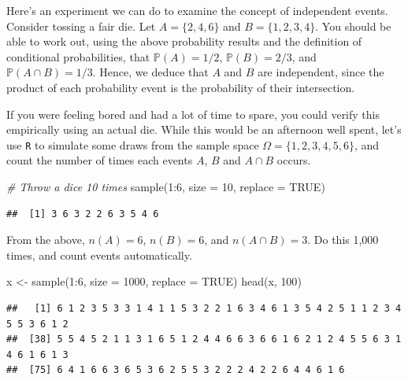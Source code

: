 \documentclass[
]{book}
\newenvironment{Shaded}{\begin{snugshade}}{\end{snugshade}}
\newcommand{\AttributeTok}[1]{\textcolor[rgb]{0.77,0.63,0.00}{#1}}
\newcommand{\CommentTok}[1]{\textcolor[rgb]{0.56,0.35,0.01}{\textit{#1}}}
\newcommand{\ConstantTok}[1]{\textcolor[rgb]{0.00,0.00,0.00}{#1}}
\newcommand{\DecValTok}[1]{\textcolor[rgb]{0.00,0.00,0.81}{#1}}
\newcommand{\FunctionTok}[1]{\textcolor[rgb]{0.00,0.00,0.00}{#1}}
\newcommand{\NormalTok}[1]{#1}
\newcommand{\OtherTok}[1]{\textcolor[rgb]{0.56,0.35,0.01}{#1}}
\newcommand{\SpecialCharTok}[1]{\textcolor[rgb]{0.00,0.00,0.00}{#1}}
\newcommand{\bbP}{\mathbb{P}}
\theoremstyle{definition}
\theoremstyle{definition}
\theoremstyle{definition}
\theoremstyle{definition}
\theoremstyle{remark}
\begin{document}
Here's an experiment we can do to examine the concept of independent events.
Consider tossing a fair die.
Let \(A = \{2, 4, 6\}\) and \(B = \{1,2,3,4\}\).
You should be able to work out, using the above probability results and the definition of conditional probabilities, that \(\bbP(A)=1/2\), \(\bbP(B)=2/3\), and \(\bbP(A \cap B)=1/3\).
Hence, we deduce that \(A\) and \(B\) are independent, since the product of each probability event is the probability of their intersection.

If you were feeling bored and had a lot of time to spare, you could verify this empirically using an actual die.
While this would be an afternoon well spent, let's use \texttt{R} to simulate some draws from the sample space \(\Omega = \{1,2,3,4,5,6\}\), and count the number of times each events \(A\), \(B\) and \(A \cap B\) occurs.

\begin{Shaded}
\begin{Highlighting}[]
\CommentTok{\# Throw a dice 10 times}
\FunctionTok{sample}\NormalTok{(}\DecValTok{1}\SpecialCharTok{:}\DecValTok{6}\NormalTok{, }\AttributeTok{size =} \DecValTok{10}\NormalTok{, }\AttributeTok{replace =} \ConstantTok{TRUE}\NormalTok{)}
\end{Highlighting}
\end{Shaded}

\begin{verbatim}
##  [1] 3 6 3 2 2 6 3 5 4 6
\end{verbatim}

From the above, \(n(A) = 6\), \(n(B)=6\), and \(n(A \cap B)=3\).
Do this 1,000 times, and count events automatically.

\begin{Shaded}
\begin{Highlighting}[]
\NormalTok{x }\OtherTok{\textless{}{-}} \FunctionTok{sample}\NormalTok{(}\DecValTok{1}\SpecialCharTok{:}\DecValTok{6}\NormalTok{, }\AttributeTok{size =} \DecValTok{1000}\NormalTok{, }\AttributeTok{replace =} \ConstantTok{TRUE}\NormalTok{)}
\FunctionTok{head}\NormalTok{(x, }\DecValTok{100}\NormalTok{)}
\end{Highlighting}
\end{Shaded}

\begin{verbatim}
##   [1] 6 1 2 3 5 3 3 1 4 1 1 5 3 2 2 1 6 3 4 6 1 3 5 4 2 5 1 1 2 3 4 5 5 3 6 1 2
##  [38] 5 5 4 5 2 1 1 3 1 6 5 1 2 4 4 6 6 3 6 6 1 6 2 1 2 4 5 5 6 3 1 4 6 1 6 1 3
##  [75] 6 4 1 6 6 3 6 5 3 6 2 5 5 3 2 2 2 4 2 2 6 4 4 6 1 6
\end{verbatim}
\end{document}

